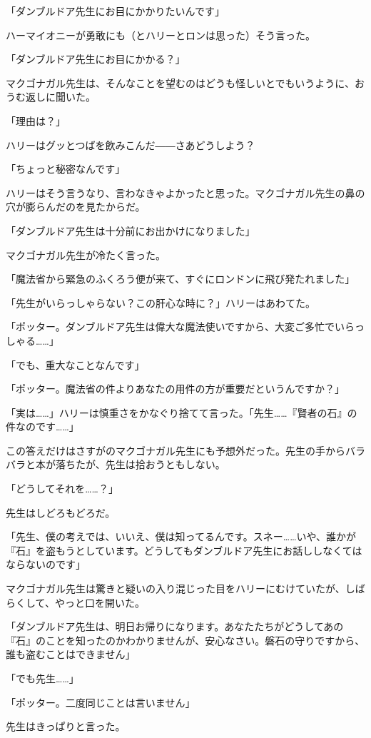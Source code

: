 \documentclass[10pt,a4paper]{article}
\begin{document}
\begin{CJK}{UTF8}{min}
「ダンブルドア先生にお目にかかりたいんです」

ハーマイオニーが勇敢にも（とハリーとロンは思った）そう言った。

「ダンブルドア先生にお目にかかる？」

マクゴナガル先生は、そんなことを望むのはどうも怪しいとでもいうように、おうむ返しに聞いた。

「理由は？」

ハリーはグッとつばを飲みこんだ――さあどうしよう？

「ちょっと秘密なんです」

ハリーはそう言うなり、言わなきゃよかったと思った。マクゴナガル先生の鼻の穴が膨らんだのを見たからだ。

「ダンブルドア先生は十分前にお出かけになりました」

マクゴナガル先生が冷たく言った。

「魔法省から緊急のふくろう便が来て、すぐにロンドンに飛び発たれました」

「先生がいらっしゃらない？この肝心な時に？」ハリーはあわてた。

「ポッター。ダンブルドア先生は偉大な魔法使いですから、大変ご多忙でいらっしゃる……」

「でも、重大なことなんです」

「ポッター。魔法省の件よりあなたの用件の方が重要だというんですか？」

「実は……」ハリーは慎重さをかなぐり捨てて言った。「先生……『賢者の石』の件なのです……」

この答えだけはさすがのマクゴナガル先生にも予想外だった。先生の手からバラバラと本が落ちたが、先生は拾おうともしない。

「どうしてそれを……？」

先生はしどろもどろだ。

「先生、僕の考えでは、いいえ、僕は知ってるんです。スネー……いや、誰かが『石』を盗もうとしています。どうしてもダンブルドア先生にお話ししなくてはならないのです」

マクゴナガル先生は驚きと疑いの入り混じった目をハリーにむけていたが、しばらくして、やっと口を開いた。

「ダンブルドア先生は、明日お帰りになります。あなたたちがどうしてあの『石』のことを知ったのかわかりませんが、安心なさい。磐石の守りですから、誰も盗むことはできません」

「でも先生……」

「ポッター。二度同じことは言いません」

先生はきっぱりと言った。


\end{CJK}
\end{document}

